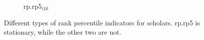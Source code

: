 \begin{refsection}
\begin{figure}[h!]
\begin{subfigure}[b]{0.48\textwidth}
         \caption{rp.rp5$_{i10}$}
     \end{subfigure}
    \caption{Different types of rank percentile indicators for scholars. rp.rp5 is stationary, while the other two are not.}
    \label{fig:compare_autrp}
\end{figure}

\fi

\end{refsection}